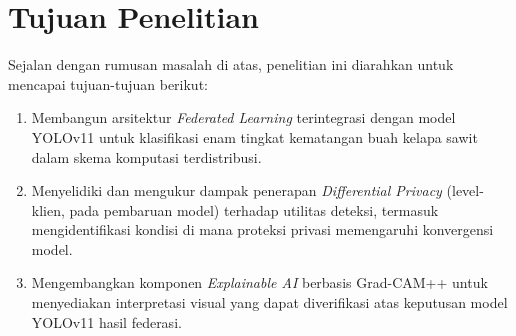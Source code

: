\section{Tujuan Penelitian}
\label{sec:tujuan-penelitian}
Sejalan dengan rumusan masalah di atas, penelitian ini diarahkan untuk mencapai tujuan-tujuan berikut:
\begin{enumerate}
    \item Membangun arsitektur \emph{Federated Learning} terintegrasi dengan model YOLOv11 untuk klasifikasi enam tingkat kematangan buah kelapa sawit dalam skema komputasi terdistribusi.
    \item Menyelidiki dan mengukur dampak penerapan \emph{Differential Privacy} (level-klien, pada pembaruan model) terhadap utilitas deteksi, termasuk mengidentifikasi kondisi di mana proteksi privasi memengaruhi konvergensi model.
    \item Mengembangkan komponen \emph{Explainable AI} berbasis Grad-CAM++ untuk menyediakan interpretasi visual yang dapat diverifikasi atas keputusan model YOLOv11 hasil federasi.
\end{enumerate}

